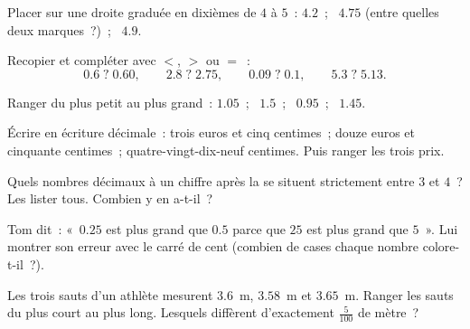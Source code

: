 \begin{exercise}[$\star$]\label{exo:g4:decimals:5}
Placer sur une droite graduée en dixièmes de $4$ à $5$~:
$4.2$~; \ $4.75$ (entre quelles deux marques~?)~; \ $4.9$.
\end{exercise}

\begin{exercise}[$\star$]\label{exo:g4:decimals:6}
Recopier et compléter avec $<$, $>$ ou $=$~:
\[
0.6 \;?\; 0.60, \qquad
2.8 \;?\; 2.75, \qquad
0.09 \;?\; 0.1, \qquad
5.3 \;?\; 5.13 .
\]
\end{exercise}

\begin{exercise}[$\star$]\label{exo:g4:decimals:7}
Ranger du plus petit au plus grand~: $1.05$~; \ $1.5$~; \ $0.95$~; \
$1.45$.
\end{exercise}

\begin{exercise}[$\star$]\label{exo:g4:decimals:8}
Écrire en écriture décimale~: trois euros et cinq centimes~; douze
euros et cinquante centimes~; quatre-vingt-dix-neuf centimes. Puis
ranger les trois prix.
\end{exercise}

\begin{exercise}[$\star$]\label{exo:g4:decimals:9}
Quels nombres décimaux à un chiffre après la  se situent
strictement entre $3$ et $4$~? Les lister tous. Combien y en
a-t-il~?
\end{exercise}

\begin{exercise}[$\star\star$]\label{exo:g4:decimals:10}
Tom dit~: «~$0.25$ est plus grand que $0.5$ parce que $25$ est plus
grand que $5$~». Lui montrer son erreur avec le carré de cent
(combien de cases chaque nombre colore-t-il~?).
\end{exercise}

\begin{exercise}[$\star\star$]\label{exo:g4:decimals:11}
Les trois sauts d'un athlète mesurent $3.6$~m, $3.58$~m et
$3.65$~m. Ranger les sauts du plus court au plus long. Lesquels
diffèrent d'exactement $\frac{5}{100}$ de mètre~?
\end{exercise}
